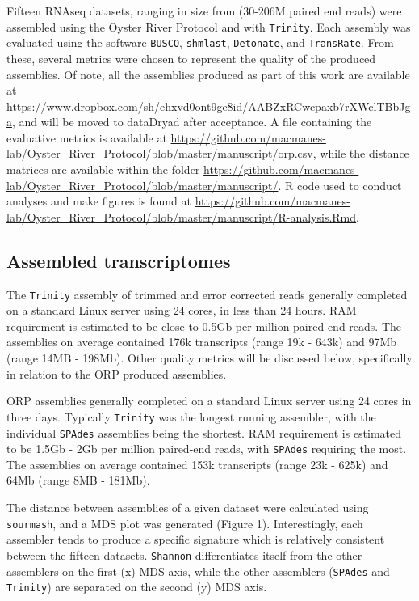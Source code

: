 \documentclass[10pt,letterpaper]{article}
\begin{document}
Fifteen RNAseq datasets, ranging in size from (30-206M paired end reads) were assembled using the Oyster River Protocol and with \texttt{Trinity}. Each assembly was evaluated using the software \texttt{BUSCO}, \texttt{shmlast}, \texttt{Detonate}, and \texttt{TransRate}. From these, several metrics were chosen to represent the quality of the produced assemblies. Of note, all the assemblies produced as part of this work are available at \url{https://www.dropbox.com/sh/ehxvd0ont9ge8id/AABZxRCwcpaxb7rXWclTBbJga}, and will be moved to dataDryad after acceptance. A file containing the evaluative metrics is available at \url{https://github.com/macmanes-lab/Oyster_River_Protocol/blob/master/manuscript/orp.csv}, while the distance matrices are available within the folder \url{https://github.com/macmanes-lab/Oyster_River_Protocol/blob/master/manuscript/}. R code used to conduct analyses and make figures is found at \url{https://github.com/macmanes-lab/Oyster_River_Protocol/blob/master/manuscript/R-analysis.Rmd}. 

\subsection{Assembled transcriptomes} 

The \texttt{Trinity} assembly of trimmed and error corrected reads generally completed on a standard Linux server using 24 cores, in less than 24 hours. RAM requirement is estimated to be close to 0.5Gb per million paired-end reads. The assemblies on average contained 176k transcripts (range 19k - 643k) and 97Mb (range 14MB - 198Mb). Other quality metrics will be discussed below, specifically in relation to the ORP produced assemblies.  

ORP assemblies generally completed on a standard Linux server using 24 cores in three days. Typically \texttt{Trinity} was the longest running assembler, with the individual \texttt{SPAdes} assemblies being the shortest. RAM requirement is estimated to be 1.5Gb - 2Gb per million paired-end reads, with \texttt{SPAdes} requiring the most. The assemblies on average contained 153k transcripts (range 23k - 625k) and 64Mb (range 8MB - 181Mb).

The distance between assemblies of a given dataset were calculated using \texttt{sourmash}, and a MDS plot was generated (Figure 1). Interestingly, each assembler tends to produce a specific signature which is relatively consistent between the fifteen datasets. \texttt{Shannon} differentiates itself from the other assemblers on the first (x) MDS axis, while the other assemblers (\texttt{SPAdes} and \texttt{Trinity}) are separated on the second (y) MDS axis. 
\end{document}
